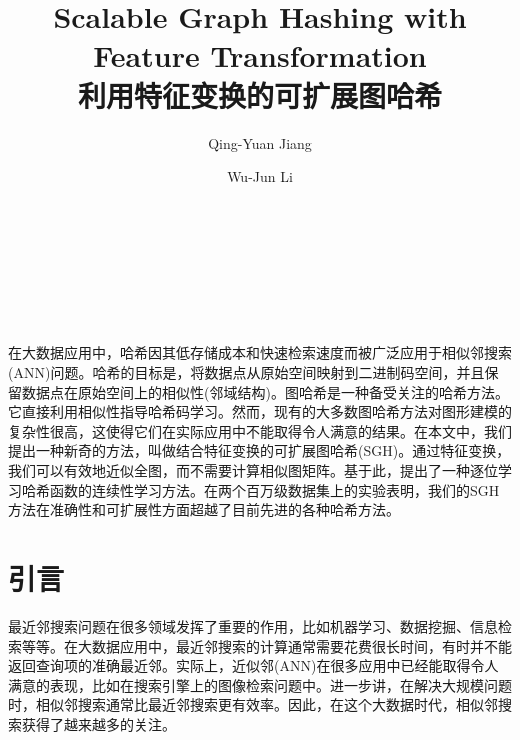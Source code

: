 \documentclass{article}
\begin{document}
  
\title{Scalable Graph Hashing with Feature Transformation \\ 
	利用特征变换的可扩展图哈希} 

\author{Qing-Yuan Jiang}
\author{Wu-Jun Li}

\address{National Key Laboratory for Novel Software Technology }\\
\address{Collaborative Innovation Center of Novel Software Technology and Industrialization}\\
\address{Department of Computer Science and Technology, Nanjing University, China }\\


\maketitle


\begin{摘要}
  
在大数据应用中，哈希因其低存储成本和快速检索速度而被广泛应用于相似邻搜索(ANN)问题。哈希的目标是，将数据点从原始空间映射到二进制码空间，并且保留数据点在原始空间上的相似性(邻域结构)。图哈希是一种备受关注的哈希方法。它直接利用相似性指导哈希码学习。然而，现有的大多数图哈希方法对图形建模的复杂性很高，这使得它们在实际应用中不能取得令人满意的结果。在本文中，我们提出一种新奇的方法，叫做结合特征变换的可扩展图哈希(SGH)。通过特征变换，我们可以有效地近似全图，而不需要计算相似图矩阵。基于此，提出了一种逐位学习哈希函数的连续性学习方法。在两个百万级数据集上的实验表明，我们的SGH方法在准确性和可扩展性方面超越了目前先进的各种哈希方法。

\end{摘要}



\section{引言}

最近邻搜索问题\cite{Andoni2010Nearest}在很多领域发挥了重要的作用，比如机器学习、数据挖掘、信息检索等等。在大数据应用中，最近邻搜索的计算通常需要花费很长时间，有时并不能返回查询项的准确最近邻。实际上，近似邻(ANN)\cite{Indyk:1998:ANN:276698.276876,4031381}在很多应用中已经能取得令人满意的表现，比如在搜索引擎上的图像检索问题中。进一步讲，在解决大规模问题时，相似邻搜索通常比最近邻搜索更有效率。因此，在这个大数据时代，相似邻搜索获得了越来越多的关注\cite{4031381}。
\end{document}
